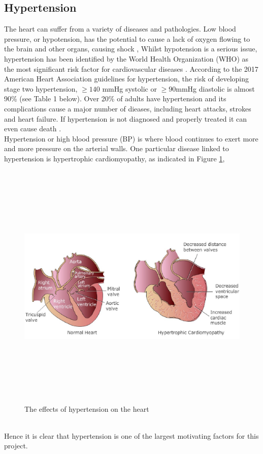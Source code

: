 \documentclass[11pt, a4paper]{article}
\begin{document}
\subsection{Hypertension}
The heart can suffer from a variety of diseases and pathologies. Low blood pressure, or hypotension, has the potential to cause  a lack of oxygen flowing to the  brain  and  other  organs, causing shock \cite{Tanveer2018}, Whilst hypotension is a serious issue, hypertension has been identified by the World Health Organization (WHO) as the most significant risk factor for cardiovascular diseases \cite{Wang2018}. According to the 2017 American Heart Association guidelines for hypertension, the risk of developing stage two hypertension, $\ge 140$ mmHg systolic or $\ge 90$mmHg diastolic is almost 90\% \cite{Bard2019} (see Table 1 below). Over 20\% of adults have hypertension  and  its  complications  cause  a  major  number  of  dieases, including heart attacks, strokes and heart failure. If hypertension is not diagnosed and properly treated it can even cause death \cite{Janjua2017}. \\ \newline \noindent  Hypertension or high blood pressure (BP) is where blood continues to exert more and more pressure on the arterial walls. One particular disease linked to hypertension is hypertrophic cardiomyopathy, as indicated in Figure \ref{hypertension}, \begin{figure}[H]
    \centering
    \includegraphics[width=12cm,height=12cm,keepaspectratio]{Figures/hypertension.jpeg}
    \caption{The effects of hypertension on the heart \cite{hypertrophic}}
    \label{hypertension}
\end{figure} \\ \newline \noindent Hence it is clear that hypertension is one of the largest motivating factors for this project.
\end{document}
